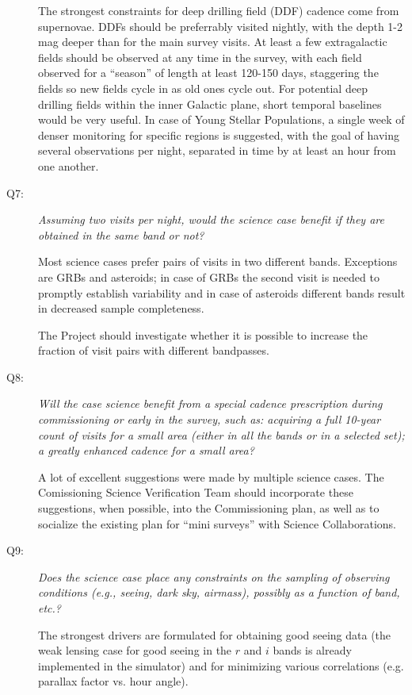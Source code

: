 \begin{description}
The strongest constraints for deep drilling field (DDF) cadence come
from supernovae. DDFs should be preferrably visited nightly, with the
depth 1-2 mag deeper than for the main survey visits. At least a few
extragalactic fields should be observed at any time in the survey, with
each field observed for a ``season'' of length at least 120-150 days,
staggering the fields so new fields cycle in as old ones cycle out. For
potential deep drilling fields within the inner Galactic plane, short
temporal baselines would be very useful. In case of Young Stellar
Populations, a single week of denser monitoring for specific regions is
suggested, with the goal of having several observations per night,
separated in time by at least an hour from one another.


\item[Q7:] {\it Assuming two visits per night, would the science case
benefit if they are obtained in the same band or not?}

Most science cases prefer pairs of visits in two different bands.
Exceptions are GRBs and asteroids; in case of GRBs the second visit is
needed to promptly establish variability and in case of asteroids
different bands result in decreased sample completeness.

The Project should investigate whether it is possible to increase the
fraction of visit pairs with different bandpasses.


\item[Q8:] {\it Will the case science benefit from a special cadence
prescription during commissioning or early in the survey, such as:
acquiring a full 10-year count of visits for a small area (either in all
the bands or in a  selected set); a greatly enhanced cadence for a small
area?}

A lot of excellent suggestions were made by multiple science cases.
The Comissioning Science Verification Team should incorporate these
suggestions, when possible, into the Commissioning plan, as well
as to socialize the existing plan for ``mini surveys'' with Science
Collaborations.


\item[Q9:] {\it Does the science case place any constraints on the
sampling of observing conditions (e.g., seeing, dark sky, airmass),
possibly as a function of band, etc.?}

The strongest drivers are formulated for obtaining good seeing data (the
weak lensing case for good seeing in the $r$ and $i$ bands is already
implemented in the simulator) and for minimizing various correlations
(e.g. parallax factor vs. hour angle).


\end{description}
